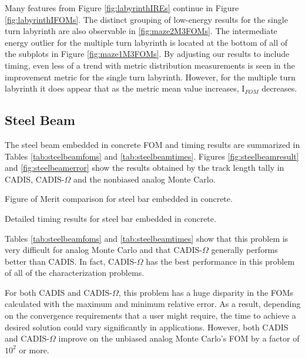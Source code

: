 Many features from Figure \ref{fig:labyrinthIREs} continue in Figure
\ref{fig:labyrinthIFOMs}. The distinct grouping of low-energy results for the
single turn labyrinth are also observable in \ref{fig:maze2M3FOMs}. The intermediate
energy outlier for the multiple turn labyrinth is located at the bottom of
all of the subplots in Figure \ref{fig:maze1M3FOMs}. By adjusting our results to
include timing, even less of a trend with metric distribution measurements is
seen in the improvement metric for the single turn labyrinth. However, for the
multiple turn labyrinth it does appear that as the metric mean value increases,
I$_{FOM}$ decreases.

\subsection{Steel Beam}
\label{subsec:resultbeam}

The steel beam embedded in concrete FOM and timing
results are summarized in Tables
\ref{tab:steelbeamfoms} and \ref{tab:steelbeamtimes}. Figures
\ref{fig:steelbeamresult} and \ref{fig:steelbeamerror} show the results obtained
by the track length tally in CADIS, CADIS-$\Omega$ and the nonbiased analog
Monte Carlo.

\begin{table}[h!]
  \centering
  
  \caption[Figure of Merit comparison for steel bar embedded in concrete.]
  {Figure of Merit comparison for steel bar embedded in concrete. }
  \label{tab:steelbeamfoms}
\end{table}

\begin{table}[h!]
  \centering
  
  \caption[Detailed timing results for steel bar embedded in concrete.]
  {Detailed timing results for steel bar embedded in concrete.}
  \label{tab:steelbeamtimes}
\end{table}

Tables \ref{tab:steelbeamfoms} and
\ref{tab:steelbeamtimes} show that this problem is very difficult for
analog Monte Carlo and that CADIS-$\Omega$ generally performs better than CADIS.
In fact, CADIS-$\Omega$ has the best performance
in this problem of all of the characterization problems.

For both CADIS and CADIS-$\Omega$, this problem has a huge disparity in the FOMs
calculated with the maximum and minimum relative error. As a result, depending
on the convergence requirements that a user might require, the time to achieve
a desired solution could vary significantly in applications. However, both CADIS
and CADIS-$\Omega$ improve on the unbiased analog Monte Carlo's FOM by a factor
of $10^{2}$ or more.

